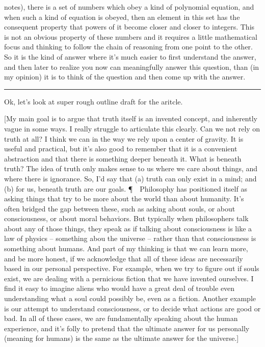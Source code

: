 \documentclass[11pt, oneside]{article}   	%
\begin{document}
\begin{itemize}
        notes), there is a set of numbers which obey a kind of polynomial
        equation, and when such a kind of equation is obeyed, then an element in
        this set has the consequent property that powers of it become closer and
        closer to integers. This is not an obvious property of these numbers and
        it requires a little mathematical focus and thinking to follow the chain
        of reasoning from one point to the other. So it is the kind of answer
        where it's much easier to first understand the answer, and then later to
        realize you now can meaningfully answer this question, than (in my
        opinion) it is to think of the question and then come up with the
        answer.
\end{itemize}

\bigskip
\hrule
\bigskip

Ok, let's look at super rough outline draft for the aritcle.

[My main goal is to argue that truth itself is an invented concept, and
inherently vague in some ways. I really struggle to articulate this clearly. Can
we not rely on truth at all? I think we can in the way we rely upon a center of
gravity. It is useful and practical, but it's also good to remember that it is a
convenient abstraction and that there is something deeper beneath it. What is
beneath truth? The idea of truth only makes sense to us where we care about
things, and where there is ignorance. So, I'd say that (a) truth can only exist
in a mind; and (b) for us, beneath truth are our goals. \P\ \ Philosophy has
positioned itself as asking things that try to be more about the world than
about humanity. It's often bridged the gap between these, such as asking about
souls, or about consciousness, or about moral behaviors. But typically
when philosophers talk about any of those things, they speak as if talking about
consciousness is like a law of physics -- something abou the universe -- rather
than that consciousness is something about humans. And part of my thinking is
that we can learn more, and be more honest, if we acknowledge that all of these
ideas are necessarily based in our personal perspective. For example, when we
try to figure out if souls exist, we are dealing with a pernicious fiction that
we have invented ourselves. I find it easy to imagine aliens who would have a
great deal of trouble even understanding what a soul could possibly be, even as
a fiction. Another example is our attempt to understand consciousness, or to
decide what actions are good or bad. In all of these cases, we are fundamentally
speaking about the human experience, and it's folly to pretend that the ultimate
answer for us personally (meaning for humans) is the same as the ultimate answer
for the universe.]
\end{document}
